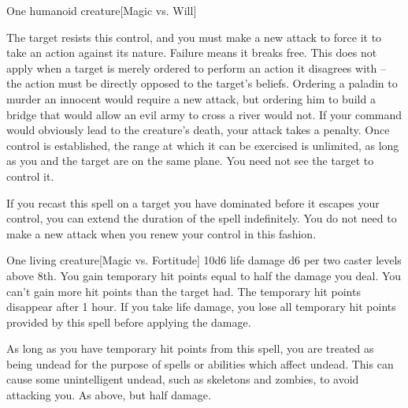 \begin{spelltarget}{One humanoid creature}[Magic vs. Will]
    \par The target resists this control, and you must make a new attack to force it to take an action against its nature. Failure means it breaks free. This does not apply when a target is merely ordered to perform an action it disagrees with -- the action must be directly opposed to the target's beliefs. Ordering a paladin to murder an innocent would require a new attack, but ordering him to build a bridge that would allow an evil army to cross a river would not. If your command would obviously lead to the creature's death, your attack takes a  penalty. Once control is established, the range at which it can be exercised is unlimited, as long as you and the target are on the same plane. You need not see the target to control it.
    \par If you recast this spell on a target you have dominated before it escapes your control, you can extend the duration of the spell indefinitely. You do not need to make a new attack when you renew your control in this fashion.
\end{spelltarget}

\spellrng{\rngclose}
\spelldur{\durlong}
\begin{spelltarget}{One living creature}[Magic vs. Fortitude]
    \spellsuccess 10d6 life damage \add d6 per two caster levels above 8th. You gain temporary hit points equal to half the damage you deal. You can't gain more hit points than the target had. The temporary hit points disappear after 1 hour. If you take life damage, you lose all temporary hit points provided by this spell before applying the damage.

    As long as you have temporary hit points from this spell, you are treated as being undead for the purpose of spells or abilities which affect undead. This can cause some unintelligent undead, such as skeletons and zombies, to avoid attacking you.
    \spellfailure As above, but half damage.
\end{spelltarget}

\begin{comment}
\subsubsection{E}
\end{comment}

